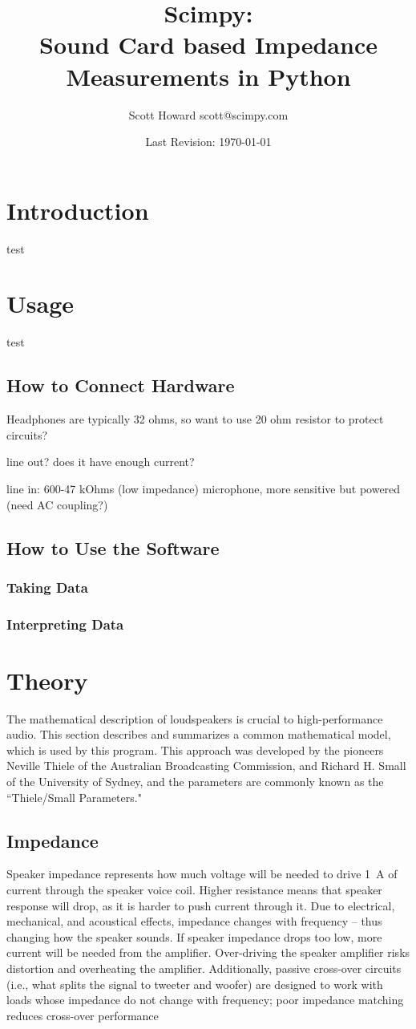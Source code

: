 \documentclass[10pt,letterpaper]{article}
\author{Scott Howard scott@scimpy.com}
\title{Scimpy:\\ \textbf{S}ound \textbf{C}ard based \textbf{I}mpedance \textbf{M}easurements in \textbf{Py}thon}
\date{Last Revision: \today}
\begin{document}
\maketitle
\tableofcontents
\section{Introduction}
test
\section{Usage}
test
\subsection{How to Connect Hardware}
Headphones are typically 32 ohms, so want to use 20 ohm resistor to protect circuits?

line out? does it have enough current?

line in: 600-47 kOhms (low impedance)
microphone, more sensitive but powered (need AC coupling?)
\subsection{How to Use the Software}
\subsubsection{Taking Data}
\subsubsection{Interpreting Data}
\section{Theory}
The mathematical description of loudspeakers is crucial to high-performance audio. This section describes and summarizes a common mathematical model, which is used by this program. This approach was developed by the pioneers Neville Thiele of the Australian Broadcasting Commission, and Richard H. Small of the University of Sydney, and the parameters are commonly known as the ``Thiele/Small Parameters."
\subsection{Impedance}\label{Impedance}
Speaker impedance represents how much voltage will be needed to drive 1~A of current  through the speaker voice coil. Higher resistance means that speaker response will drop, as it is harder to push current through it. Due to electrical, mechanical, and acoustical effects, impedance changes with frequency -- thus changing how the speaker sounds. If speaker impedance drops too low, more current will be needed from the amplifier. Over-driving the speaker amplifier risks distortion and overheating the amplifier. Additionally, passive cross-over circuits (i.e., what splits the signal to tweeter and woofer) are designed to work with loads whose impedance do not change with frequency; poor impedance matching reduces cross-over performance
\end{document}
